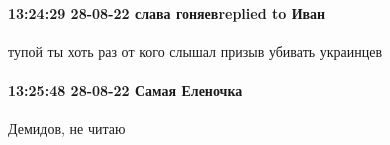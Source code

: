  
 
 
 
 

\paragraph{13:24:29 28-08-22 слава гоняевreplied to Иван}

тупой ты хоть раз от кого слышал призыв убивать украинцев

\paragraph{13:25:48 28-08-22 Самая Еленочка}
Демидов, не читаю
